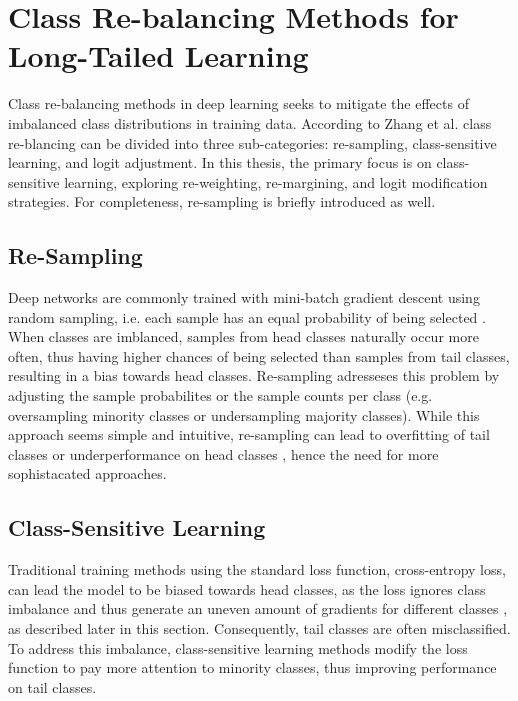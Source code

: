 
\section{Class Re-balancing Methods for Long-Tailed Learning}
\label{sec:lt_methods}

Class re-balancing methods in deep learning seeks to mitigate the effects of imbalanced class distributions in training data. According to Zhang et al. \cite{zhang2023deep} class re-blancing can be divided into three sub-categories: re-sampling, class-sensitive learning, and logit adjustment. In this thesis, the primary focus is on class-sensitive learning, exploring re-weighting, re-margining, and logit modification strategies. For completeness, re-sampling is briefly introduced as well.


\subsection{Re-Sampling}
\label{sec:re-sampling}
Deep networks are commonly trained with mini-batch gradient descent using random sampling, i.e. each sample has an equal probability of being selected \cite{zhang2023deep}. When classes are imblanced, samples from head classes naturally occur more often, thus having higher chances of being selected than samples from tail classes, resulting in a bias towards head classes. Re-sampling adresseses this problem by adjusting the sample probabilites or the sample counts per class (e.g. oversampling minority classes or undersampling majority classes). While this approach seems simple and intuitive, re-sampling can lead to overfitting of tail classes or underperformance on head classes \cite{zhang2023deep}, hence the need for more sophistacated approaches.

\subsection{Class-Sensitive Learning}
\label{sec:class-sensitive-learning}

Traditional training methods using the standard loss function, cross-entropy loss, can lead the model to be biased towards head classes, as the loss ignores class imbalance and thus generate an uneven amount of gradients for different classes \cite{zhang2023deep}, as described later in this section. Consequently, tail classes are often misclassified. To address this imbalance, class-sensitive learning methods modify the loss function to pay more attention to minority classes, thus improving performance on tail classes.

